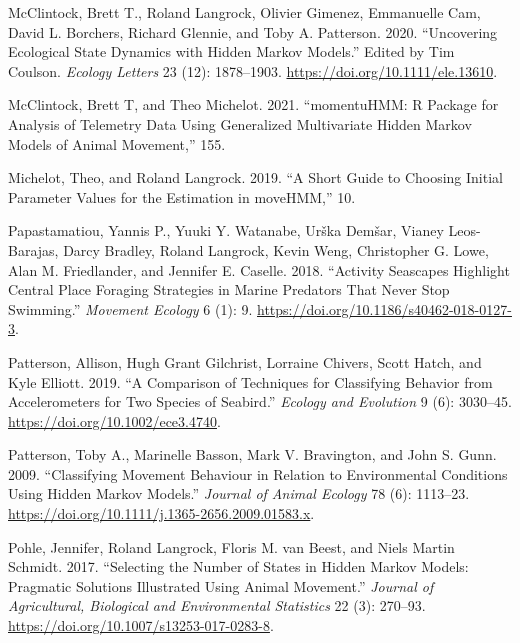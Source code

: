 \documentclass[english,msc,numbers,hidelinks]{coppe}
\newlength{\cslhangindent}
\newenvironment{CSLReferences}[2] %
 {%
  \setlength{\parindent}{0pt}
  \ifodd #1 \everypar{\setlength{\hangindent}{\cslhangindent}}\ignorespaces\fi
  \ifnum #2 > 0
  \setlength{\parskip}{#2\baselineskip}
  \fi
 }%
 {}
\begin{document}
\begin{CSLReferences}{1}{0}
  \leavevmode{}%
  McClintock, Brett T., Roland Langrock, Olivier Gimenez, Emmanuelle Cam, David L. Borchers, Richard Glennie, and Toby A. Patterson. 2020. {``Uncovering Ecological State Dynamics with Hidden Markov Models.''} Edited by Tim Coulson. \emph{Ecology Letters} 23 (12): 1878--1903. \url{https://doi.org/10.1111/ele.13610}.

  \leavevmode{}%
  McClintock, Brett T, and Theo Michelot. 2021. {``momentuHMM: R Package for Analysis of Telemetry Data Using Generalized Multivariate Hidden Markov Models of Animal Movement,''} 155.

  \leavevmode{}%
  Michelot, Theo, and Roland Langrock. 2019. {``A Short Guide to Choosing Initial Parameter Values for the Estimation in moveHMM,''} 10.

  \leavevmode{}%
  Papastamatiou, Yannis P., Yuuki Y. Watanabe, Urška Demšar, Vianey Leos-Barajas, Darcy Bradley, Roland Langrock, Kevin Weng, Christopher G. Lowe, Alan M. Friedlander, and Jennifer E. Caselle. 2018. {``Activity Seascapes Highlight Central Place Foraging Strategies in Marine Predators That Never Stop Swimming.''} \emph{Movement Ecology} 6 (1): 9. \url{https://doi.org/10.1186/s40462-018-0127-3}.

  \leavevmode{}%
  Patterson, Allison, Hugh Grant Gilchrist, Lorraine Chivers, Scott Hatch, and Kyle Elliott. 2019. {``A Comparison of Techniques for Classifying Behavior from Accelerometers for Two Species of Seabird.''} \emph{Ecology and Evolution} 9 (6): 3030--45. \url{https://doi.org/10.1002/ece3.4740}.

  \leavevmode{}%
  Patterson, Toby A., Marinelle Basson, Mark V. Bravington, and John S. Gunn. 2009. {``Classifying Movement Behaviour in Relation to Environmental Conditions Using Hidden Markov Models.''} \emph{Journal of Animal Ecology} 78 (6): 1113--23. \url{https://doi.org/10.1111/j.1365-2656.2009.01583.x}.

  \leavevmode{}%
  Pohle, Jennifer, Roland Langrock, Floris M. van Beest, and Niels Martin Schmidt. 2017. {``Selecting the Number of States in Hidden Markov Models: Pragmatic Solutions Illustrated Using Animal Movement.''} \emph{Journal of Agricultural, Biological and Environmental Statistics} 22 (3): 270--93. \url{https://doi.org/10.1007/s13253-017-0283-8}.


\end{CSLReferences}
\end{document}
